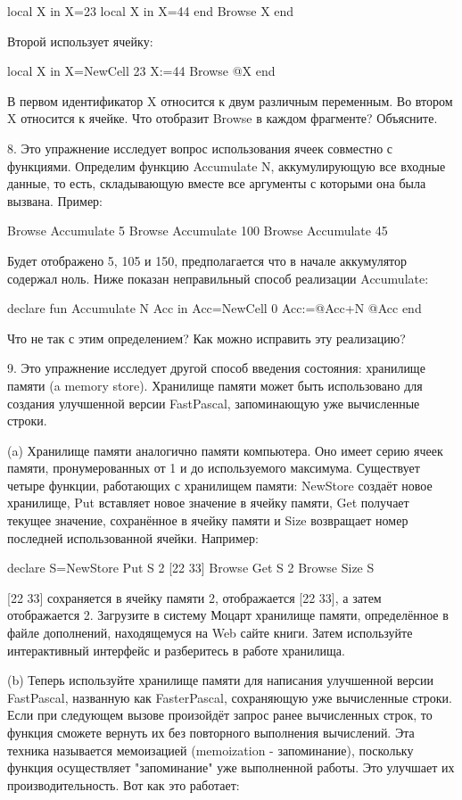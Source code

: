 local X in
X=23
local X in
X=44
end
{Browse X}
end

Второй использует ячейку:

local X in
X={NewCell 23}
X:=44
{Browse @X}
end

В первом идентификатор X относится к двум различным переменным. Во втором X относится к ячейке. Что отобразит Browse в каждом фрагменте? Объясните.

8. Это упражнение исследует вопрос использования ячеек совместно с функциями. Определим функцию {Accumulate N}, аккумулирующую все входные данные, то есть, складывающую вместе все аргументы с которыми она была вызвана. Пример:

{Browse {Accumulate 5}}
{Browse {Accumulate 100}}
{Browse {Accumulate 45}}

Будет отображено 5, 105 и 150, предполагается что в начале аккумулятор содержал ноль. Ниже показан неправильный способ реализации Accumulate:

declare
fun {Accumulate N}
Acc in
Acc={NewCell 0}
Acc:=@Acc+N
@Acc
end

Что не так с этим определением? Как можно исправить эту реализацию?

9. Это упражнение исследует другой способ введения состояния: хранилище памяти (a memory store). Хранилище памяти может быть использовано для создания улучшенной версии FastPascal, запоминающую уже вычисленные строки.

(a) Хранилище памяти аналогично памяти компьютера. Оно имеет серию ячеек памяти, пронумерованных от 1 и до используемого максимума. Существует четыре функции, работающих с хранилищем памяти: NewStore создаёт новое хранилище, Put вставляет новое значение в ячейку памяти, Get получает текущее значение, сохранённое в ячейку памяти и Size возвращает номер последней использованной ячейки. Например:

declare
S={NewStore}
{Put S 2 [22 33]}
{Browse {Get S 2}}
{Browse {Size S}}

[22 33] сохраняется в ячейку памяти 2, отображается [22 33], а затем отображается 2. Загрузите в систему Моцарт хранилище памяти, определённое в файле дополнений, находящемуся на Web сайте книги. Затем используйте интерактивный интерфейс и разберитесь в работе хранилища.

(b) Теперь используйте хранилище памяти для написания улучшенной версии FastPascal, названную как FasterPascal, сохраняющую уже вычисленные строки. Если при следующем вызове произойдёт запрос ранее вычисленных строк, то функция сможете вернуть их без повторного выполнения вычислений. Эта техника называется мемоизацией (memoization - запоминание), поскольку функция осуществляет "запоминание" уже выполненной работы. Это улучшает их производительность. Вот как это работает:

